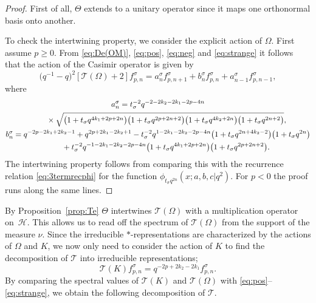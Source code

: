 \documentclass[pdftex]{sigma}
\numberwithin{equation}{section}
\numberwithin{theorem}{section}
\numberwithin{proposition}{section}
\numberwithin{lemma}{section}
\numberwithin{corollary}{section}
\numberwithin{definition}{section}
\numberwithin{example}{section}
\numberwithin{remark}{section}
\numberwithin{note}{section}
\begin{document}
\begin{proof}
First of all, $\Theta$ extends to a unitary operator since it maps one orthonormal basis onto another.

To check the intertwining property, we consider the explicit action of $\Omega$.
First assume $p \geq 0$. From \eqref{eq:De(OM)}, \eqref{eq:pos}, \eqref{eq:neg} and \eqref{eq:strange} it follows that the action of the Casimir operator is given by
\[
\big(q^{-1}-q\big)^2 [\mathcal T(\Omega)+2 ] f_{p,n}^\sigma = a_n^\sigma f_{p,n+1}^\sigma + b_n^\sigma f_{p,n}^\sigma + a_{n-1}^\sigma f_{p,n-1}^\sigma,
\]
where
\begin{gather*}
a_n^\sigma =   t_\sigma^{-2}q^{-2-2k_2-2k_1-2p-4n}\\
 \hphantom{a_n^\sigma =}{}
 \times \sqrt{ \big(1+t_\sigma q^{4k_1+2p+2n}\big)\big(1+t_\sigma q^{2p+2n+2}\big)\big(1+t_\sigma q^{4k_2+2n}\big) \big(1+t_\sigma q^{2n+2}\big)},\\
b_n^\sigma=   q^{-2p-2k_1+2k_2-1} +q^{2p+2k_1-2k_2+1} - t_\sigma^{-2}q^{1-2k_1-2k_2-2p-4n}\big(1+t_\sigma q^{2n+4k_2-2}\big)\big(1+t_\sigma q^{2n}\big) \\
\phantom{b_n^\sigma=}{}
 + t_\sigma^{-2}q^{-1-2k_1-2k_2-2p-4n}\big(1+t_\sigma q^{4k_1+2p+2n}\big)\big(1+t_\sigma q^{2p+2n+2}\big).
\end{gather*}
The intertwining property follows from comparing this with the recurrence relation \eqref{eq:3termrecphi} for the function $\phi_{t_\sigma q^{2n}}(x;a,b,c|q^2)$. For $p <0$ the proof runs along the same lines.
\end{proof}

By Proposition~\ref{prop:Te} $\Theta$ intertwines $\mathcal T(\Omega)$ with a multiplication operator on~$\mathcal H$. This allows us to read of\/f the spectrum of $\mathcal T(\Omega)$ from the support of the measure $\nu$. Since the irreducible $*$-representations are characterized by the actions of $\Omega$ and $K$, we now only need to consider the action of $K$ to f\/ind the decomposition of $\mathcal T$ into irreducible representations;
\[
\mathcal T(K) f_{p,n}^\sigma = q^{-2p + 2k_2 -2k_1}  f_{p,n}^\sigma.
\]
By comparing the spectral values of $\mathcal T(K)$ and $\mathcal T(\Omega)$ with \eqref{eq:pos}--\eqref{eq:strange}, we obtain the following decomposition of $\mathcal T$.
\end{document}
